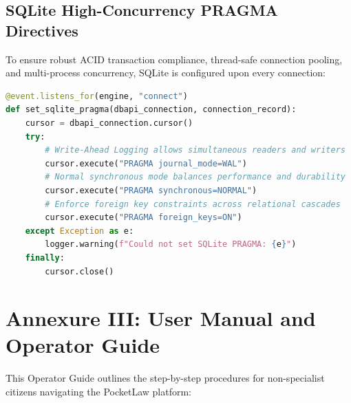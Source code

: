 \section*{SQLite High-Concurrency PRAGMA Directives}
To ensure robust ACID transaction compliance, thread-safe connection pooling, and multi-process concurrency, SQLite is configured upon every connection:
\begin{lstlisting}[language=python,caption={SQLite Connection PRAGMAs in `backend/database.py`}]
@event.listens_for(engine, "connect")
def set_sqlite_pragma(dbapi_connection, connection_record):
    cursor = dbapi_connection.cursor()
    try:
        # Write-Ahead Logging allows simultaneous readers and writers
        cursor.execute("PRAGMA journal_mode=WAL")
        # Normal synchronous mode balances performance and durability
        cursor.execute("PRAGMA synchronous=NORMAL")
        # Enforce foreign key constraints across relational cascades
        cursor.execute("PRAGMA foreign_keys=ON")
    except Exception as e:
        logger.warning(f"Could not set SQLite PRAGMA: {e}")
    finally:
        cursor.close()
\end{lstlisting}

\newpage

\chapter*{Annexure III: User Manual and Operator Guide}

This Operator Guide outlines the step-by-step procedures for non-specialist citizens navigating the PocketLaw platform:

